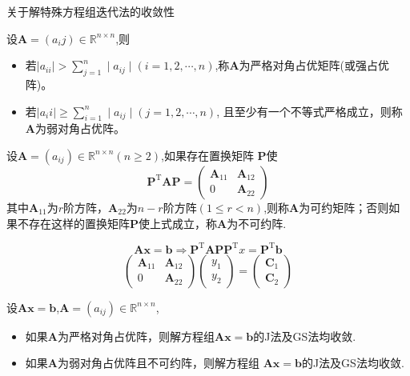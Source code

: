 \begin{note}
    关于解特殊方程组迭代法的收敛性
    \begin{definition}[对角占优]
        设$\boldsymbol{A}=(a_ij)\in\mathbb{R}^{n\times n}$,则
        \begin{itemize}
            \item 若$\mid a_{ii}\mid>\sum_{j=1}^{n}\mid a_{ij}\mid(i=1,2,\cdots,n)$,称$\boldsymbol{A}$为严格对角占优矩阵(或强占优阵)。
            \item 若$\mid a_ii\mid \geq \sum _{i= 1}^{n}\mid a_{ij}\mid ( j= 1, 2, \cdots , n)$, 且至少有一个不等式严格成立，则称$\boldsymbol{A}$为弱对角占优阵。
        \end{itemize}
    \end{definition}
    \begin{definition}[(可约与不可约阵)]
        设$\boldsymbol{A}=(a_{ij})\in\mathbb{R}^{n\times n}(n\geq2)$,如果存在置换矩阵 $\boldsymbol{P}$使
        \[
            \boldsymbol{P}^{\mathrm{T}}\boldsymbol{A}\boldsymbol{P}=\begin{pmatrix}\boldsymbol{A}_{11}&\boldsymbol{A}_{12}\\0&\boldsymbol{A}_{22}\end{pmatrix}
        \]
        其中$\boldsymbol{A}_{11}$为$r$阶方阵，$\boldsymbol{A}_{22}$为$n-r$阶方阵$(1\leq r<n)$,则称$\boldsymbol{A}$为可约矩阵；否则如果不存在这样的置换矩阵$\boldsymbol{P}$使上式成立，称$\boldsymbol{A}$为不可约阵.
    \end{definition}
    \[
        \boldsymbol{Ax} = \boldsymbol{b}\Rightarrow \boldsymbol{P}^{\mathrm{T}}\boldsymbol{A}\boldsymbol{P}\boldsymbol{P}^{\mathrm{T}}x = \boldsymbol{P}^{\mathrm{T}}\boldsymbol{b}
    \]
    \[
        \begin{pmatrix}\boldsymbol{A}_{11}&\boldsymbol{A}_{12}\\0&\boldsymbol{A}_{22}\end{pmatrix}\begin{pmatrix}
            y_1\\y_2
        \end{pmatrix} = \begin{pmatrix}
            \boldsymbol{C}_1\\\boldsymbol{C}_2
        \end{pmatrix}
    \]
\end{note}
\begin{theorem}
    设$\boldsymbol{Ax}=\boldsymbol{b}$,$\boldsymbol{A}=(a_{ij})\in\mathbb{R}^{n\times n}$,
    \begin{itemize}
        \item 如果$\boldsymbol{A}$为严格对角占优阵，则解方程组$\boldsymbol{Ax}=\boldsymbol{b}$的J法及GS法均收敛.
        \item 如果$\boldsymbol{A}$为弱对角占优阵且不可约阵，则解方程组 $\boldsymbol{Ax}=\boldsymbol{b}$的J法及GS法均收敛.
    \end{itemize}
\end{theorem}
